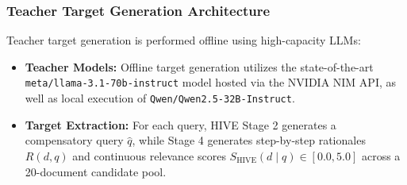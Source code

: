 \documentclass[11pt,a4paper]{article}
\begin{document}
\subsubsection{Teacher Target Generation Architecture}
Teacher target generation is performed offline using high-capacity LLMs:
\begin{itemize}
    \item \textbf{Teacher Models:} Offline target generation utilizes the state-of-the-art \texttt{meta/llama-3.1-70b-instruct} model hosted via the NVIDIA NIM API, as well as local execution of \texttt{Qwen/Qwen2.5-32B-Instruct}.
    \item \textbf{Target Extraction:} For each query, HIVE Stage 2 generates a compensatory query $\hat{q}$, while Stage 4 generates step-by-step rationales $R(d, q)$ and continuous relevance scores $S_{\text{HIVE}}(d \mid q) \in [0.0, 5.0]$ across a 20-document candidate pool.
\end{itemize}
\end{document}
